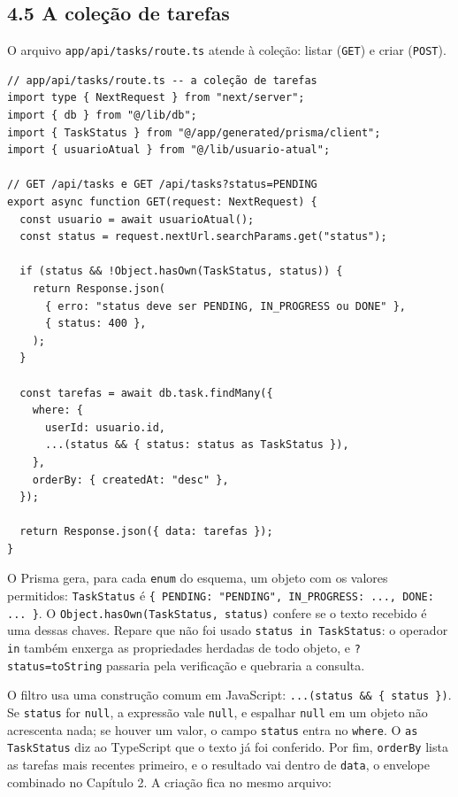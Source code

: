 \subsection{4.5 A coleção de tarefas}

O arquivo \texttt{app/api/tasks/route.ts} atende à coleção: listar (\texttt{GET}) e criar (\texttt{POST}).

\begin{codigo}
\begin{Verbatim}[breaklines=true, breaksymbolleft={}, fontsize=\footnotesize]
// app/api/tasks/route.ts -- a coleção de tarefas
import type { NextRequest } from "next/server";
import { db } from "@/lib/db";
import { TaskStatus } from "@/app/generated/prisma/client";
import { usuarioAtual } from "@/lib/usuario-atual";

// GET /api/tasks e GET /api/tasks?status=PENDING
export async function GET(request: NextRequest) {
  const usuario = await usuarioAtual();
  const status = request.nextUrl.searchParams.get("status");

  if (status && !Object.hasOwn(TaskStatus, status)) {
    return Response.json(
      { erro: "status deve ser PENDING, IN_PROGRESS ou DONE" },
      { status: 400 },
    );
  }

  const tarefas = await db.task.findMany({
    where: {
      userId: usuario.id,
      ...(status && { status: status as TaskStatus }),
    },
    orderBy: { createdAt: "desc" },
  });

  return Response.json({ data: tarefas });
}
\end{Verbatim}
\end{codigo}

O Prisma gera, para cada \texttt{enum} do esquema, um objeto com os valores permitidos: \texttt{TaskStatus} é \texttt{\{ PENDING: "PENDING", IN\_PROGRESS: ..., DONE: ... \}}. O \texttt{Object.hasOwn(TaskStatus, status)} confere se o texto recebido é uma dessas chaves. Repare que não foi usado \texttt{status in TaskStatus}: o operador \texttt{in} também enxerga as propriedades herdadas de todo objeto, e \texttt{?status=toString} passaria pela verificação e quebraria a consulta.

O filtro usa uma construção comum em JavaScript: \texttt{...(status \&\& \{ status \})}. Se \texttt{status} for \texttt{null}, a expressão vale \texttt{null}, e espalhar \texttt{null} em um objeto não acrescenta nada; se houver um valor, o campo \texttt{status} entra no \texttt{where}. O \texttt{as TaskStatus} diz ao TypeScript que o texto já foi conferido. Por fim, \texttt{orderBy} lista as tarefas mais recentes primeiro, e o resultado vai dentro de \texttt{data}, o envelope combinado no Capítulo 2. A criação fica no mesmo arquivo:

